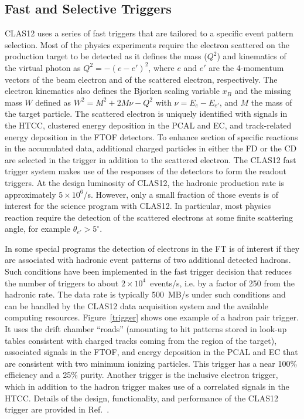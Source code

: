 \documentclass[final,3p,twocolumn]{elsarticle}
\begin{document}
\subsection{Fast and Selective Triggers} 

CLAS12 uses a series of fast triggers that are tailored to a specific event pattern selection. Most of the physics
experiments require the electron scattered on the production target to be detected as it defines the mass
($Q^2$) and kinematics of the virtual photon as $Q^2 = -(e - e')^2$, where $e$ and $e'$ are the 4-momentum
vectors of the beam electron and of the scattered electron, respectively. The electron kinematics also defines
the Bjorken scaling variable $x_B$  and the missing mass $W$ defined as $W^2 = M^2 + 2M\nu - Q^2$ with
$\nu = E_e - E_{e'}$, and $M$ the mass of the target particle. The scattered electron is uniquely identified with
signals in the HTCC, clustered energy deposition  in the PCAL and EC, and track-related energy deposition in the
FTOF detectors. To enhance section of specific reactions in the accumulated data, additional charged particles
in either the FD or the CD are selected in the trigger in addition to the scattered electron. The CLAS12 fast
trigger system makes use of the responses of the detectors to form the readout triggers. At the design
luminosity of CLAS12, the hadronic production rate is approximately $5 \times 10^6$/s. However, only a small
fraction of those events is of interest for the science program with CLAS12. In particular, most physics reaction
require the detection of the scattered electrons at some finite scattering angle, for example $\theta_{e'} > 5^\circ$.  
   
   

In some special programs the detection of electrons in the FT is of interest if they are associated with hadronic
event patterns of two additional detected hadrons. Such conditions have been implemented in the fast trigger
decision that reduces the number of triggers to about $2 \times 10^4$~events/s, i.e. by  a factor of 250 from the
hadronic rate. The data rate is typically 500~MB/s under such conditions and can be handled by the CLAS12 data
acquisition system and the available computing resources. Figure~\ref{trigger} shows one example of a hadron pair
trigger. It uses the drift chamber ``roads'' (amounting to hit patterns stored in look-up tables consistent with
charged tracks coming from the region of the target), associated signals in the FTOF, and energy deposition in the
PCAL and EC that are consistent with two minimum ionizing particles. This trigger has a near 100\% efficiency and a
25\% purity. Another trigger is the inclusive electron trigger, which in addition to the hadron trigger makes use of
a correlated signals in the HTCC. Details of the design, functionality, and performance of the CLAS12 trigger are
provided in Ref.~\cite{TRIG}. 
\end{document}
